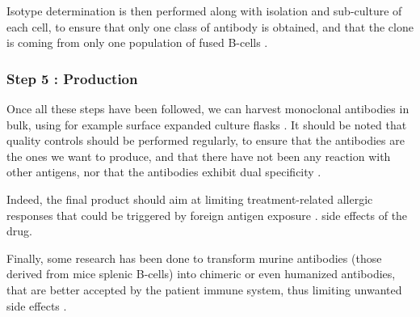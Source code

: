 Isotype determination is then performed along with isolation and sub-culture
of each cell, to ensure that only one class of antibody is obtained,
and that the clone is coming from only one population 
of fused B-cells \cite{nelson_monoclonal_2000}.

\subsubsection{Step 5 : Production}

Once all these steps have been followed, we can harvest monoclonal
antibodies in bulk, using for example surface expanded culture flasks
\cite{nelson_monoclonal_2000}. It should be noted that quality controls
should be performed regularly, to ensure that the antibodies are the ones
we want to produce, and that there have not been any reaction with other
antigens, nor that the antibodies exhibit dual 
specificity \cite{nelson_monoclonal_2000}.

Indeed, the final product should aim at limiting treatment-related
allergic responses that could be triggered by foreign antigen exposure
\cite{national_research_council_us_committee_on_methods_of_producing_monoclonal_antibodies_large-scale_1999}.
side effects of the drug.

Finally, some research has been done to transform murine antibodies
(those derived from mice splenic B-cells) into chimeric or even humanized antibodies,
that are better accepted by the patient immune system, thus limiting
unwanted side effects \cite{noauthor_how_2020} \cite{ahmadzadeh_antibody_2014}.
